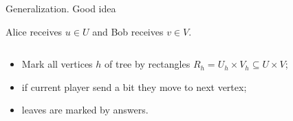 \begin{frame}{Generalization. Good idea}

    Alice receives $u \in U$ and Bob receives $v \in V$.

    \begin{columns}[t]
		\begin{column}{0.7\textwidth}
            \begin{itemize}
                \item<2-> Mark all vertices $h$ of tree by rectangles $R_h = U_h \times V_h \subseteq U \times V$;
	            \item<3-> if current player send a bit they move to next vertex;
    		    \item<8-> leaves are marked by answers.
	        \end{itemize}



        \end{column}
        
		\begin{column}{0.25\textwidth}
            
		\end{column}
	\end{columns}

\end{frame}


